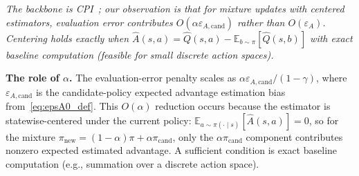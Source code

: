 \documentclass{article}
\theoremstyle{plain}
\theoremstyle{definition}
\theoremstyle{remark}
\newtheorem{remark}[theorem]{Remark}
\newcommand{\shortonly}[1]{#1}
\newcommand{\longonly}[1]{}
\newcommand{\shortonly}[1]{}
\newcommand{\longonly}[1]{#1}
\newcommand{\E}{\mathbb{E}}
\begin{document}
\emph{The backbone is CPI~\citep{KakadeLangford2002}; our observation is that for mixture updates with centered estimators, evaluation error contributes $O(\alpha\varepsilon_{A,\mathrm{cand}})$ rather than $O(\varepsilon_A)$.
Centering holds exactly when $\widehat A(s,a)=\widehat Q(s,a) - \E_{b\sim\pi}[\widehat Q(s,b)]$ with exact baseline computation (feasible for small discrete action spaces).}

\longonly{
\begin{remark}[Approximate centering]
\label{rem:approx_centering}
If the estimator is not exactly centered, define the centering defect
\[
\varepsilon_{\mathrm{cent}}
:=
\sup_{s\in\mathcal{R}_\pi}\left|\E_{a\sim\pi(\cdot\mid s)}[\widehat A(s,a)]\right|.
\]
The same proof as Theorem~\ref{thm:monotone_with_error} yields the more general bound
\begin{multline*}
\eta(\pi_{\mathrm{new}})
\ge
\widehat{L}_\pi(\pi_{\mathrm{new}})
- \frac{1}{1-\gamma}\Bigl((1-\alpha)\varepsilon_{\mathrm{cent}}+\alpha\varepsilon_{A,\mathrm{cand}}\Bigr) \\
- \frac{2\varepsilon_{\mathrm{CPI}}\,\gamma}{(1-\gamma)^2}\,\alpha^2.
\end{multline*}
In particular, Theorem~\ref{thm:monotone_with_error} corresponds to $\varepsilon_{\mathrm{cent}}=0$.
\end{remark}}

\textbf{The role of $\alpha$.}
The evaluation-error penalty scales as $\alpha \varepsilon_{A,\mathrm{cand}} / (1-\gamma)$, where $\varepsilon_{A,\mathrm{cand}}$ is the
candidate-policy expected advantage estimation bias from~\eqref{eq:epsA0_def}.
This $O(\alpha)$ reduction occurs because the estimator is statewise-centered under the current policy:
$\E_{a \sim \pi(\cdot\mid s)}[\widehat{A}(s,a)] = 0$, so for the mixture $\pi_{\mathrm{new}}=(1-\alpha)\pi+\alpha\pi_{\mathrm{cand}}$, only the $\alpha\pi_{\mathrm{cand}}$ component contributes nonzero expected estimated advantage.
\longonly{A sufficient condition for exact centering is exact computation of the baseline in~\eqref{eq:Ahat_def} (Remark~\ref{rem:baseline}).}%
\shortonly{A sufficient condition is exact baseline computation (e.g., summation over a discrete action space).}
\end{document}
